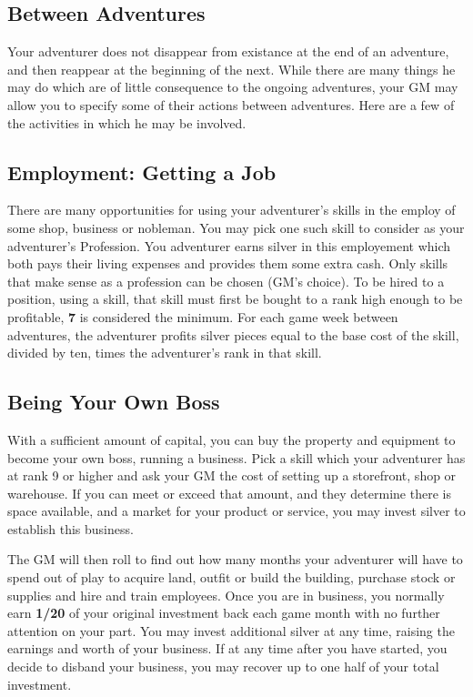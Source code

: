 \begin{multicols*}{2}
\section{Between Adventures}
Your adventurer does not disappear from existance at the end of an adventure, and then reappear at the beginning of the next. While there are many things he may do which are of little consequence to the ongoing adventures, your GM may allow you to specify some of their actions between adventures. Here are a few of the activities in which he may
be involved.
\subsection{Employment: Getting a Job}
There are many opportunities for using your adventurer’s skills in the employ of some shop, business or nobleman. You may pick one such skill to consider as your adventurer’s Profession. You adventurer earns silver in this
employement which both pays their living expenses and provides them some extra cash. Only skills that make sense as a profession can be chosen (GM’s choice). To be hired to a position, using a skill, that skill must first be bought to a rank high enough to be profitable, \textbf{7} is considered the minimum. For each game week between adventures, the adventurer profits silver pieces equal to the base cost of the skill, divided by ten, times the adventurer’s rank in that skill.
\subsection{Being Your Own Boss}
With a sufficient amount of capital, you can buy the property and equipment to become your own boss, running a business. Pick a skill which your adventurer has at rank 9 or higher and ask your GM the cost of setting up a storefront, shop or warehouse. If you can meet or exceed that amount, and they determine there is space available, and a market for your product or service, you may invest silver to establish this business.

The GM will then roll  to find out how many months your adventurer will have to spend out of play to acquire land, outfit or build the building, purchase stock or supplies and hire and train employees. Once you are in business, you normally earn \textbf{1/20} of your original investment back each game month with no further attention on your part. You may invest additional silver at any time, raising the earnings and worth of your business. If at any time after you have started, you decide to disband your business, you may recover up to one half of your total investment.


\end{multicols*}
